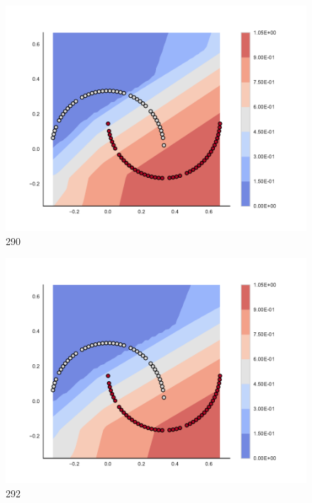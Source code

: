 \begin{subfigure}[b]{0.09\textwidth}
    \includegraphics[clip, trim=2.35cm 1.75cm 4.5cm 0cm,width=\textwidth]{img/convergence/290.pdf}
    \caption{290}
    \label{fig:convergence_290}
\end{subfigure}
%
\begin{subfigure}[b]{0.09\textwidth}
    \includegraphics[clip, trim=2.35cm 1.75cm 4.5cm 0cm,width=\textwidth]{img/convergence/292.pdf}
    \caption{292}
    \label{fig:convergence_292}
\end{subfigure}
%
